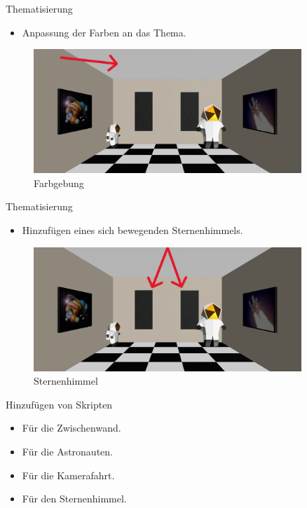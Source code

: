 \documentclass{beamer}
\begin{document}
\begin{frame}{Thematisierung}
\begin{itemize}
\item Anpassung der Farben an das Thema.
\end{itemize}
\begin{figure}
    \centering
\includegraphics[width=0.9\textwidth, keepaspectratio]{thema3}
\caption{Farbgebung}
\end{figure}
\end{frame}

\begin{frame}{Thematisierung}
\begin{itemize}
\item Hinzufügen eines sich bewegenden Sternenhimmels.
\end{itemize}
\begin{figure}
    \centering
\includegraphics[width=0.9\textwidth, keepaspectratio]{thema4}
\caption{Sternenhimmel \cite{nightsky}}
\end{figure}
\end{frame}

\begin{frame}{Hinzufügen von Skripten}
\begin{itemize}
\item Für die Zwischenwand.
\item Für die Astronauten.
\item Für die Kamerafahrt.
\item Für den Sternenhimmel.
\end{itemize}
\end{frame}
\end{document}
